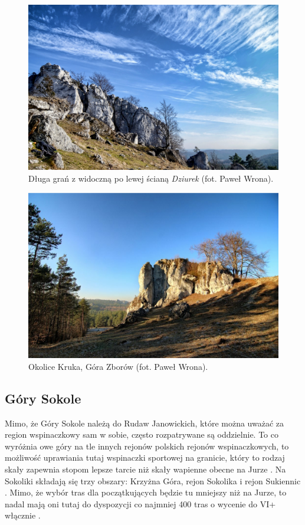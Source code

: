 \documentclass{article}
\begin{document}
\begin{figure}[!htbp]
	\begin{center}
		\includegraphics[width=0.9\linewidth]{images/jura-gora-zborow.eps}
	\end{center}
	\caption{Długa grań z widoczną po lewej ścianą \textit{Dziurek} (fot. Paweł Wrona)\cite{jura-gora-zborow}.}
	\label{zborow}
\end{figure}

\begin{figure}[!htbp]
	\begin{center}
		\includegraphics[width=0.9\linewidth]{images/jura-gora-zborow-2.eps}
	\end{center}
	\caption{Okolice Kruka, Góra Zborów (fot. Paweł Wrona)\cite{jura-gora-zborow}.}
	\label{}
\end{figure}

\subsection{Góry Sokole}
Mimo, że Góry Sokole należą do Rudaw Janowickich, które można uważać za region wspinaczkowy sam w sobie, często rozpatrywane są oddzielnie. To co wyróżnia owe góry na tle innych rejonów polskich rejonów wspinaczkowych, to możliwość uprawiania tutaj wspinaczki sportowej na granicie, który to rodzaj skały zapewnia stopom lepsze tarcie niż skały wapienne obecne na Jurze \cite{podroze-se-wspin}. Na Sokoliki składają się trzy obszary: Krzyżna Góra, rejon Sokolika i rejon Sukiennic \cite{eng-pol-wspin}. Mimo, że wybór tras dla początkujących będzie tu mniejszy niż na Jurze, to nadal mają oni tutaj do dyspozycji co najmniej 400 tras o wycenie do VI+ włącznie \cite{topo-sokoliki}.
\end{document}
